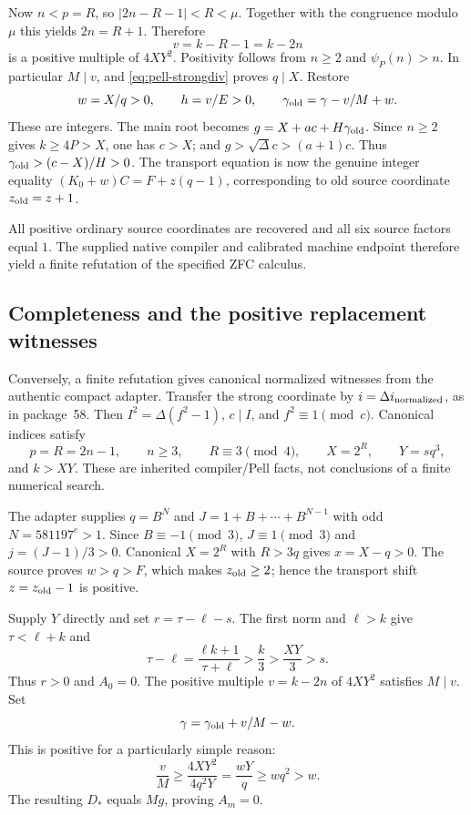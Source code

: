 Now $n<p=R$, so $|2n-R-1|<R<\mu$. Together with the congruence modulo
$\mu$ this yields $2n=R+1$. Therefore
\[
 v=k-R-1=k-2n
\]
is a positive multiple of $4XY^2$. Positivity follows from $n\ge2$ and
$\psi_P(n)>n$. In particular $M\mid v$, and
\eqref{eq:pell-strongdiv} proves $q\mid X$. Restore
\begin{equation}
 w=X/q>0,\qquad h=v/E>0,\qquad
 \gamma_{\rm old}=\gamma-v/M+w.
 \label{eq:pell-restore}
\end{equation}
These are integers. The main root becomes
$g=X+ac+H\gamma_{\rm old}$. Since $n\ge2$ gives $k\ge4P>X$, one has
$c>X$; and $g>\sqrt\Delta c>(a+1)c$. Thus
$\gamma_{\rm old}>(c-X)/H>0$. The transport equation is now the genuine
integer equality $(K_0+w)C=F+z(q-1)$, corresponding to old source
coordinate $z_{\rm old}=z+1$.

All positive ordinary source coordinates are recovered and all six source
factors equal $1$. The supplied native compiler and calibrated machine
endpoint therefore yield a finite refutation of the specified ZFC calculus.

\subsection{Completeness and the positive replacement witnesses}

Conversely, a finite refutation gives canonical normalized witnesses from
the authentic compact adapter. Transfer the strong coordinate by
$i=\Delta i_{\rm normalized}$, as in package~58. Then
$I^2=\Delta(f^2-1)$, $c\mid I$, and $f^2\equiv1\pmod c$.
Canonical indices satisfy
\[
 p=R=2n-1,\qquad n\ge3,\qquad R\equiv3\pmod4,
 \qquad X=2^R,\qquad Y=sq^3,
\]
and $k>XY$. These are inherited compiler/Pell facts, not conclusions of a
finite numerical search.

The adapter supplies $q=B^N$ and $J=1+B+\cdots+B^{N-1}$ with odd
$N=581197^e>1$. Since $B\equiv-1\pmod3$, $J\equiv1\pmod3$ and
$j=(J-1)/3>0$. Canonical $X=2^R$ with $R>3q$ gives $x=X-q>0$.
The source proves $w>q>F$, which makes $z_{\rm old}\ge2$; hence the
transport shift $z=z_{\rm old}-1$ is positive.

Supply $Y$ directly and set $r=\tau-\ell-s$. The first norm and
$\ell>k$ give $\tau<\ell+k$ and
\[
 \tau-\ell=\frac{\ell k+1}{\tau+\ell}
       >\frac{k}{3}>\frac{XY}{3}>s.
\]
Thus $r>0$ and $A_0=0$. The positive multiple $v=k-2n$ of $4XY^2$
satisfies $M\mid v$. Set
\[
 \gamma=\gamma_{\rm old}+v/M-w.
\]
This is positive for a particularly simple reason:
\[
 \frac vM\ge\frac{4XY^2}{4q^2Y}
       =\frac{wY}{q}\ge wq^2>w.
\]
The resulting $D_*$ equals $Mg$, proving $A_m=0$.

